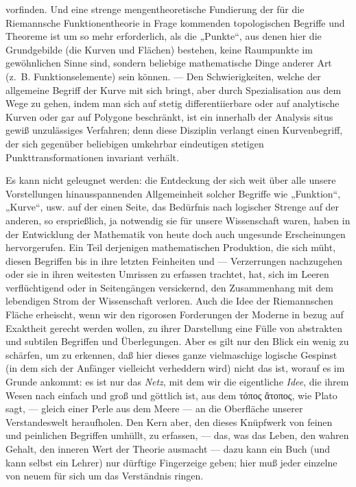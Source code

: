 \documentclass{article}
\begin{document}
vorfinden. Und eine strenge mengentheoretische Fundierung der für die Riemannsche Funktionentheorie in Frage kommenden topologischen Begriffe und Theoreme ist um so mehr erforderlich, als die „Punkte“, aus denen hier die Grundgebilde (die Kurven und Flächen) bestehen, keine Raumpunkte im gewöhnlichen Sinne sind, sondern beliebige mathematische Dinge anderer Art (z.~B. Funktionselemente) sein können. --- Den Schwierigkeiten, welche der allgemeine Begriff der Kurve mit sich bringt, aber durch Spezialisation aus dem Wege zu gehen, indem man sich auf stetig differentiierbare oder auf analytische Kurven oder gar auf Polygone beschränkt, ist ein innerhalb der Analysis situs gewiß unzulässiges Verfahren; denn diese Disziplin verlangt einen Kurvenbegriff, der sich gegenüber beliebigen umkehrbar eindeutigen stetigen Punkttransformationen invariant verhält.

Es kann nicht geleugnet werden: die Entdeckung der sich weit über alle unsere Vorstellungen hinausspannenden Allgemeinheit solcher Begriffe wie „Funktion“, „Kurve“, usw. auf der einen Seite, das Bedürfnis nach logischer Strenge auf der anderen, so ersprießlich, ja notwendig sie für unsere Wissenschaft waren, haben in der Entwicklung der Mathematik von heute doch auch ungesunde Erscheinungen hervorgerufen. Ein Teil derjenigen mathematischen Produktion, die sich müht, diesen Begriffen bis in ihre letzten Feinheiten und --- Verzerrungen nachzugehen oder sie in ihren weitesten Umrissen zu erfassen trachtet, hat, sich im Leeren verflüchtigend oder in Seitengängen versickernd, den Zusammenhang mit dem lebendigen Strom der Wissenschaft verloren. Auch die Idee der Riemannschen Fläche erheischt, wenn wir den rigorosen Forderungen der Moderne in bezug auf Exaktheit gerecht werden wollen, zu ihrer Darstellung eine Fülle von abstrakten und subtilen Begriffen und Überlegungen. Aber es gilt nur den Blick ein wenig zu schärfen, um zu erkennen, daß hier dieses ganze vielmaschige logische Gespinst (in dem sich der Anfänger vielleicht verheddern wird) nicht das ist, worauf es im Grunde ankommt: es ist nur das \emph{Netz}, mit dem wir die eigentliche \emph{Idee}, die ihrem Wesen nach einfach und groß und göttlich ist, aus dem τόπος ἄτοπος, wie Plato sagt, --- gleich einer Perle aus dem Meere --- an die Oberfläche unserer Verstandeswelt heraufholen. Den Kern aber, den dieses Knüpfwerk von feinen und peinlichen Begriffen umhüllt, zu erfassen, --- das, was das Leben, den wahren Gehalt, den inneren Wert der Theorie ausmacht --- dazu kann ein Buch (und kann selbst ein Lehrer) nur dürftige Fingerzeige geben; hier muß jeder einzelne von neuem für sich um das Verständnis ringen.
\end{document}

